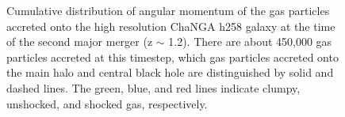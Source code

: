 \documentclass[manuscript]{aastex}
\begin{document}
\begin{figure}
\centerline{}
\caption[]{ Cumulative distribution of angular momentum of the gas particles accreted onto the high resolution ChaNGA h258 galaxy at the time of the second major merger (z $\sim$ 1.2). There are about 450,000 gas particles accreted at this timestep, which gas particles accreted onto the main halo and central black hole are distinguished by solid and dashed lines. The green, blue, and red lines indicate clumpy, unshocked, and shocked gas, respectively.}
\label{hrh258angmom_merger2} 
\end{figure}
\end{document}

